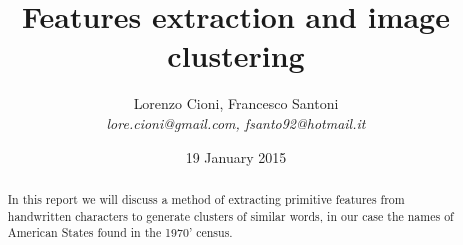 \documentclass[a4paper,12pt]{article}
\title{\bf Features extraction and image clustering}
\date {19 January 2015}
\author{Lorenzo Cioni, Francesco Santoni\\\textit{{\small lore.cioni@gmail.com, fsanto92@hotmail.it}}}
\begin{document}
\maketitle

\begin{abstract}
In this report we will discuss a method of extracting primitive features from handwritten characters to generate clusters of similar words, in our case the names of American States found in the 1970' census.
\end{abstract}

\tableofcontents









\end{document}
